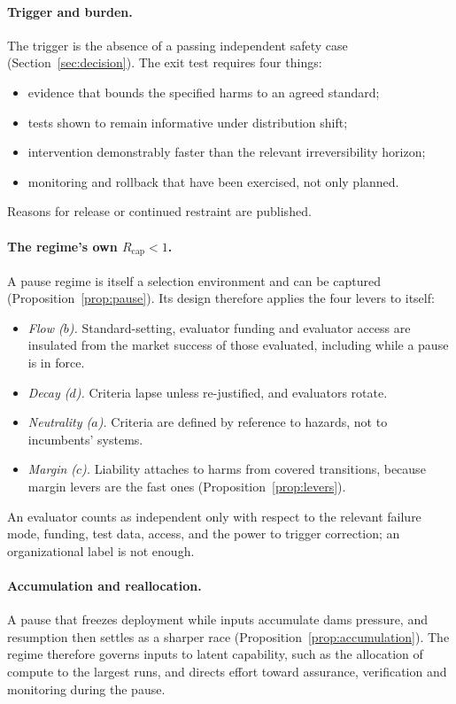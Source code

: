 \documentclass[11pt]{article}
\theoremstyle{plain}
\theoremstyle{definition}
\newcommand{\Rcap}{R_{\mathrm{cap}}}
\begin{document}
\paragraph{Trigger and burden.} The trigger is the absence of a passing independent safety case (Section~\ref{sec:decision}). The exit test requires four things:
\begin{itemize}[leftmargin=*]
\item evidence that bounds the specified harms to an agreed standard;
\item tests shown to remain informative under distribution shift;
\item intervention demonstrably faster than the relevant irreversibility horizon;
\item monitoring and rollback that have been exercised, not only planned.
\end{itemize}
Reasons for release or continued restraint are published.

\paragraph{The regime's own $\Rcap<1$.} A pause regime is itself a selection environment and can be captured (Proposition~\ref{prop:pause}). Its design therefore applies the four levers to itself:
\begin{itemize}[leftmargin=*]
\item \emph{Flow ($b$).} Standard-setting, evaluator funding and evaluator access are insulated from the market success of those evaluated, including while a pause is in force.
\item \emph{Decay ($d$).} Criteria lapse unless re-justified, and evaluators rotate.
\item \emph{Neutrality ($a$).} Criteria are defined by reference to hazards, not to incumbents' systems.
\item \emph{Margin ($c$).} Liability attaches to harms from covered transitions, because margin levers are the fast ones (Proposition~\ref{prop:levers}).
\end{itemize}
An evaluator counts as independent only with respect to the relevant failure mode, funding, test data, access, and the power to trigger correction; an organizational label is not enough.

\paragraph{Accumulation and reallocation.} A pause that freezes deployment while inputs accumulate dams pressure, and resumption then settles as a sharper race (Proposition~\ref{prop:accumulation}). The regime therefore governs inputs to latent capability, such as the allocation of compute to the largest runs, and directs effort toward assurance, verification and monitoring during the pause.
\end{document}
